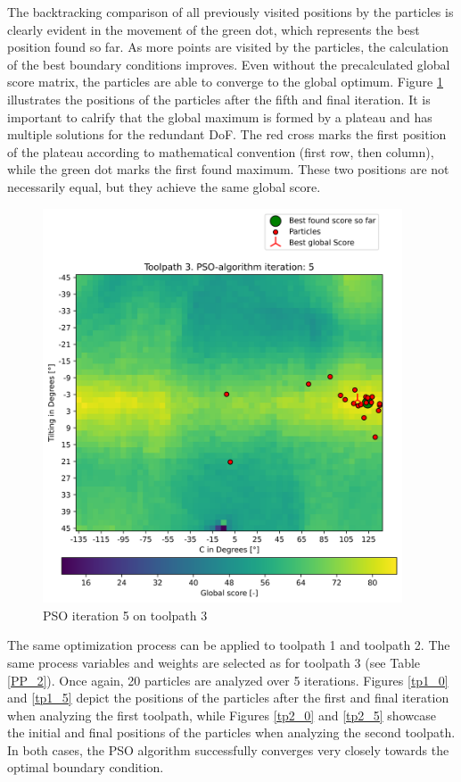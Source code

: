 The backtracking comparison of all previously visited positions by the particles is clearly evident in the movement of the green dot, which represents the best position found so far. As more points are visited by the particles, the calculation of the best boundary conditions improves. Even without the precalculated global score matrix, the particles are able to converge to the global optimum.
Figure \ref{5_true} illustrates the positions of the particles after the fifth and final iteration. It is important to calrify that the global maximum is formed by a plateau and has multiple solutions for the redundant \acrshort{DoF}. The red cross marks the first position of the plateau according to mathematical convention (first row, then column), while the green dot marks the first found maximum. These two positions are not necessarily equal, but they achieve the same global score.

\begin{figure}[H]
	\centerline{\includegraphics[width=0.95\textwidth]{figures/swarm_true/3_5.png}}
	\caption{PSO iteration 5 on toolpath 3}
	\label{5_true}
\end{figure}



The same optimization process can be applied to toolpath 1 and toolpath 2. The same process variables and weights are selected as for toolpath 3 (see Table \ref{PP_2}). Once again, 20 particles are analyzed over 5 iterations. Figures \ref{tp1_0} and \ref{tp1_5} depict the positions of the particles after the first and final iteration when analyzing the first toolpath, while Figures \ref{tp2_0} and \ref{tp2_5} showcase the initial and final positions of the particles when analyzing the second toolpath. In both cases, the PSO algorithm successfully converges very closely towards the optimal boundary condition.
\newpage
	
